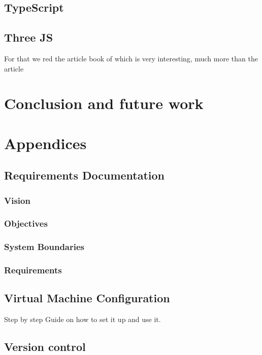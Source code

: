 \documentclass{scrartcl}
\begin{document}
\subsection{TypeScript}
\subsection{Three JS}

For that we red the article book of \cite{Jerald:2015:VBH:2792790}
which is very interesting, much more than the article
\cite{Diniz:2017:UGO:3100317.3100324}

\section{Conclusion and future work}

\section{Appendices}
\subsection{Requirements Documentation}
\subsubsection{Vision}
\subsubsection{Objectives}
\subsubsection{System Boundaries}
\subsubsection{Requirements}

\subsection{Virtual Machine Configuration}
Step by step Guide on how to set it up and use it.

\subsection{Version control}
\end{document}
